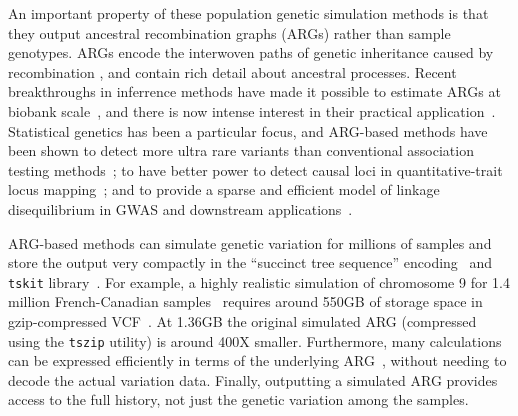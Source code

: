 \documentclass[unnumsec,webpdf,modern,large,namedate]{oup-authoring-template}%
\begin{document}
An important property of these population genetic simulation methods is that
they output ancestral recombination graphs (ARGs)
rather than sample genotypes.
ARGs encode the interwoven paths
of genetic inheritance caused by
recombination \citep{hudson1983properties,griffiths1997ancestral,wong2023general},
and contain rich detail about ancestral processes.
Recent breakthroughs in inferrence methods have made it possible
to estimate ARGs at biobank scale~\citep{kelleher2019,zhang2023},
and there is now intense interest in their practical
application~\citep{lewanski2024era,brandt2024promise}.
Statistical genetics has been a particular focus,
and ARG-based methods have been shown
to detect more ultra rare variants than conventional association testing
methods~\citep{zhang2023}; to
have better power to detect causal loci in
quantitative-trait locus mapping~\citep{link2023tree};
and to provide a sparse and efficient model of linkage disequilibrium
in GWAS and downstream applications~\citep{nowbandegani2023extremely}.

ARG-based methods can simulate genetic variation for millions of
samples and store the output very compactly
in the ``succinct tree sequence'' encoding~\citep{wong2023general}
and \texttt{tskit} library~\citep{ralph2020}.
For example, a highly realistic simulation
of chromosome 9 for 1.4 million
French-Canadian samples~\citep{anderson2023}
requires around 550GB of storage space in gzip-compressed
VCF~\citep{danecek2011}.
At 1.36GB the original simulated ARG
(compressed using the \texttt{tszip} utility) is around 400X smaller.
Furthermore, many calculations can
be expressed efficiently in terms of the underlying
ARG~\citep{kelleher2016efficient,ralph2020}, without
needing to decode the actual variation data.
Finally, outputting a simulated ARG provides access to the full
history, not just the genetic variation among the samples.
\end{document}
